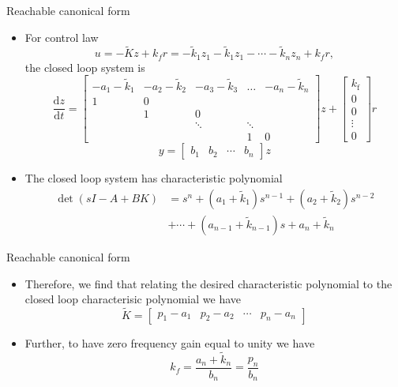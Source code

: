 \documentclass{beamer-control}
\begin{document}
\begin{frame}{Reachable canonical form }
	\begin{itemize}
		\item For control law \[u=-\tilde{K}z+k_f r=-\tilde{k}_1z_1-\tilde{k}_1z_1- \cdots - \tilde{k}_nz_n+k_fr,\] the closed loop system is 
		\[  \frac{\mathrm{d} z}{\mathrm{d} t}=\begin{bmatrix}
			-a_1-\tilde{k}_1 & -a_2-\tilde{k}_2 & -a_3-\tilde{k}_3 & \ldots & -a_n-\tilde{k}_n \\
			1 & 0 & & & \\
			& 1 & 0 & & \\
			&  & \ddots & \ddots & \\
			& & & 1 & 0
		\end{bmatrix} z+\begin{bmatrix}
			k_{\mathrm{f}} \\
			0 \\
			0 \\
			\vdots \\
			0
		\end{bmatrix} r  \]
		\[y = \begin{bmatrix}
			b_1 & b_2 & \cdots & b_n
		\end{bmatrix}z\]
		\item The closed loop system has characteristic polynomial
		\begin{align*}
		\operatorname{det}(sI-A+BK) &= s^n+\left(a_1+\tilde{k}_1\right) s^{n-1}+\left(a_2+\tilde{k}_2\right) s^{n-2}\\
		&+\cdots+\left(a_{n-1}+\tilde{k}_{n-1}\right) s+a_n+\tilde{k}_n   \end{align*}
	\end{itemize}
\end{frame}


\begin{frame}{Reachable canonical form}
\begin{itemize}
	\item Therefore, we find that relating the desired characteristic polynomial to the closed loop characterisic polynomial we have
	\[\tilde{K} = \begin{bmatrix}
		p_1-a_1 & p_2-a_2 & \cdots & p_n-a_n
	\end{bmatrix}\]
	\item Further, to have zero frequency gain equal to unity we have
	\[k_f = \frac{a_n+\tilde{k}_n}{b_n}=\frac{p_n}{b_n}\]
\end{itemize}
\end{frame}
\end{document}
